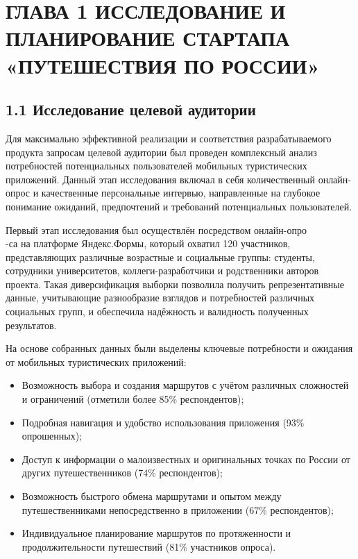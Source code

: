 \section{ГЛАВА 1 ИССЛЕДОВАНИЕ И ПЛАНИРОВАНИЕ СТАРТАПА «ПУТЕШЕСТВИЯ ПО РОССИИ»}

\subsection*{1.1 Исследование целевой аудитории}

Для максимально эффективной реализации и соответствия разрабатываемого продукта запросам целевой аудитории был проведен комплексный анализ потребностей потенциальных пользователей мобильных туристических приложений. Данный этап исследования включал в себя количественный онлайн-опрос и качественные персональные интервью, направленные на глубокое понимание ожиданий, предпочтений и требований потенциальных пользователей.

Первый этап исследования был осуществлён посредством онлайн-опро\\-са на платформе Яндекс.Формы, который охватил 120 участников, представляющих различные возрастные и социальные группы: студенты, сотрудники университетов, коллеги-разработчики и родственники авторов проекта. Такая диверсификация выборки позволила получить репрезентативные данные, учитывающие разнообразие взглядов и потребностей различных социальных групп, и обеспечила надёжность и валидность полученных результатов.

На основе собранных данных были выделены ключевые потребности и ожидания от мобильных туристических приложений:
\begin{itemize}
    \item Возможность выбора и создания маршрутов с учётом различных сложностей и ограничений (отметили более 85\% респондентов);
    \item Подробная навигация и удобство использования приложения (93\% опрошенных);
    \item Доступ к информации о малоизвестных и оригинальных точках по России от других путешественников (74\% респондентов);
    \item Возможность быстрого обмена маршрутами и опытом между путешественниками непосредственно в приложении (67\% респондентов);
    \item Индивидуальное планирование маршрутов по протяженности и продолжительности путешествий (81\% участников опроса).
\end{itemize}



